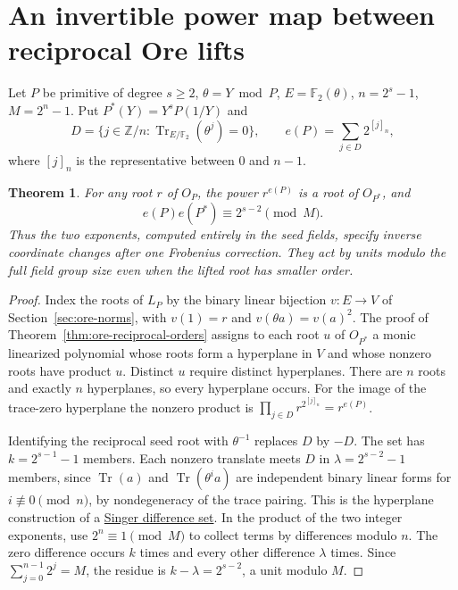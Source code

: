 \documentclass[11pt]{article}
\newtheorem{theorem}{Theorem}
\newcommand{\F}{\mathbb F_2}
\begin{document}
\section{An invertible power map between reciprocal Ore lifts}\label{sec:ore-trace-coordinate}
Let \(P\) be primitive of degree \(s\ge2\), \(\theta=Y\bmod P\),
\(E=\F(\theta)\), \(n=2^s-1\), \(M=2^n-1\).
Put \(P^*(Y)=Y^sP(1/Y)\) and
\[
 D=\{j\in\mathbb Z/n:\operatorname{Tr}_{E/\F}(\theta^j)=0\},
\qquad e(P)=\sum_{j\in D}2^{[j]_n},
\]
where \([j]_n\) is the representative between \(0\) and \(n-1\).

\begin{theorem}
For any root \(r\) of \(O_P\), the power \(r^{e(P)}\) is a root
of \(O_{P^*}\), and
\[
                e(P)e(P^*)\equiv2^{s-2}\pmod M .
\]
Thus the two exponents, computed entirely in the seed fields, specify
inverse coordinate changes after one Frobenius correction. They act by
units modulo the full field group size even when the lifted root has
smaller order.
\end{theorem}
\begin{proof}
Index the roots of \(L_P\) by the binary linear bijection \(v:E\to V\)
of Section~\ref{sec:ore-norms}, with \(v(1)=r\) and
\(v(\theta a)=v(a)^2\). The proof of Theorem~\ref{thm:ore-reciprocal-orders}
assigns to each root \(u\) of \(O_{P^*}\) a monic linearized polynomial
whose roots form a hyperplane in \(V\) and whose nonzero roots have
product \(u\). Distinct \(u\) require distinct hyperplanes. There are
\(n\) roots and exactly \(n\) hyperplanes, so every hyperplane occurs.
For the image of the trace-zero hyperplane the nonzero product is
\(\prod_{j\in D}r^{2^{[j]_n}}=r^{e(P)}\).

Identifying the reciprocal seed root with \(\theta^{-1}\) replaces \(D\)
by \(-D\). The set has \(k=2^{s-1}-1\) members. Each nonzero translate
meets \(D\) in \(\lambda=2^{s-2}-1\) members, since
\(\operatorname{Tr}(a)\) and \(\operatorname{Tr}(\theta^i a)\) are
independent binary linear forms for \(i\not\equiv0\pmod n\), by
nondegeneracy of the trace pairing. This is the hyperplane construction
of a \href{https://doi.org/10.1090/S0002-9947-1938-1501951-4}{Singer
difference set}. In the product of the two integer exponents, use
\(2^n\equiv1\pmod M\) to collect terms by differences modulo \(n\).
The zero difference occurs \(k\) times and every other difference
\(\lambda\) times. Since \(\sum_{j=0}^{n-1}2^j=M\), the residue is
\(k-\lambda=2^{s-2}\), a unit modulo \(M\).
\end{proof}
\end{document}
